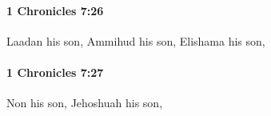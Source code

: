 		\paragraph{1 Chronicles 7:26} %
			\label{1CHRONICLES-7-26}

			Laadan his son, Ammihud his son, Elishama his son,


		\paragraph{1 Chronicles 7:27} %
			\label{1CHRONICLES-7-27}

			Non his son, Jehoshuah his son,



